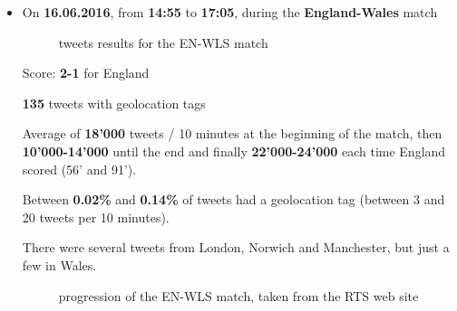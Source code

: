 \documentclass[a4paper,11pt]{report}
\begin{document}
\begin{itemize}
	\item On \textbf{16.06.2016}, from \textbf{14:55} to \textbf{17:05}, during the \textbf{England-Wales} match\\
	\vspace{70pt}
	\parbox[t]{\dimexpr\textwidth-\leftmargin}{%
		\begin{figure}
		\vspace{-50pt}
		\begin{center}
		\vspace{-8pt}
		\caption{tweets results for the EN-WLS match}
		\end{center}
		\end{figure}
		\vspace{-15pt}
		
		\vspace{40pt}
		Score: \textbf{2-1} for England
		
		\vspace{5pt}
		\textbf{135} tweets with geolocation tags
		
		\vspace{5pt}
		Average of \textbf{18'000} tweets / 10 minutes at the beginning of the match, then \textbf{10'000-14'000} until the end and finally \textbf{22'000-24'000} each time England scored (56' and 91').
		
		\vspace{5pt}
		Between \textbf{0.02\%} and \textbf{0.14\%} of tweets had a geolocation tag (between 3 and 20 tweets per 10 minutes).
		
		\vspace{5pt}
		There were several tweets from London, Norwich and Manchester, but just a few in Wales.
	}
	\begin{figure}[H]
	\vspace{-5pt}
	\begin{center}
	\vspace{-5pt}
	\caption{progression of the EN-WLS match, taken from the RTS web site}
	\end{center}
	\end{figure}
	\vspace{-20pt}
	\newpage
	

\end{itemize}
\end{document}
